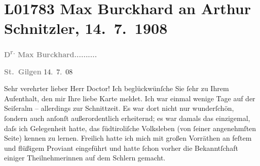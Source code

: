 

\section[Max Burckhard an Arthur Schnitzler, 14. 7. 1908]{L01783 Max Burckhard an Arthur Schnitzler, 14. 7. 1908}
\nopagebreak{}
\rehead{ }\normalsize\beginnumbering{}
\toendnotes[C]{\smallbreak\pagebreak[2]}
\toendnotes[C]{\smallbreak}
\toendnotes[C]{\smallbreak}
\pstart
           {\pb}\textcolor{gray}{\textbf{D\textsuperscript{r.} Max Burckhard}}\hfill \textcolor{gray}{\textbf{..........}}\pend
           
\pstart
           \raggedleft{}\textcolor{gray}{\textbf{St. Gilgen}}{ }14. 7. 08\pend
           
\pstart{}Sehr verehrter lieber Herr Doctor!\pend\vspace{0.5em}
\pstart
           Ich beglückwünſche Sie{ }ſehr  zu Ihrem Aufenthalt,
               den mir Ihre liebe Karte meldet. Ich war einmal wenige Tage auf der Seiſeralm – allerdings zur Schnittzeit. Es war
               dort nicht nur wunderſchön,{ }ſondern auch anſonſt außerordentlich erheiternd; es war
               damals das einzigemal, daſs ich Gelegenheit hatte, das ſüdtiroliſche Volksleben (von{ }ſeiner angenehmſten Seite) kennen zu lernen.
               Freilich hatte ich mich mit großen Vorräthen an feſtem und flüßigem Proviant
               eingeführt und hatte{ }ſchon vorher die Bekanntſchaft einiger Theilnehmerinnen auf dem{ }Schlern gemacht.\pend
           
